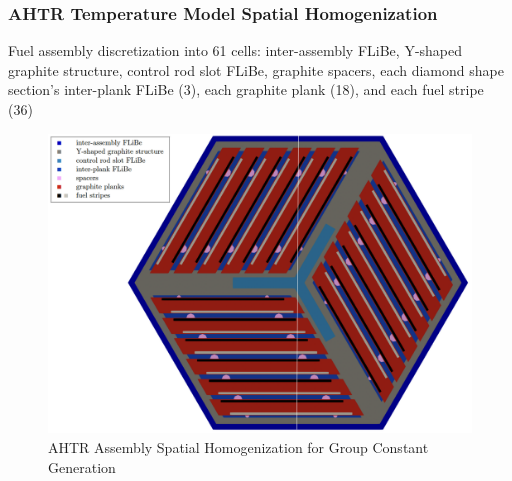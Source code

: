 \begin{frame}
    \frametitle{AHTR Temperature Model Spatial Homogenization}
        Fuel assembly discretization into 61 cells: inter-assembly FLiBe, Y-shaped graphite 
        structure, control rod slot FLiBe, graphite spacers, each diamond shape 
        section's inter-plank FLiBe (3), each graphite plank (18), and each
        fuel stripe (36)
    \begin{figure}[]
        \begin{minipage}[c]{0.75\textwidth}
            \centering
            \includegraphics[width=0.85\linewidth]{figures/assembly_mg_pres.png}
        \end{minipage}\hfill
        \begin{minipage}[c]{0.25\textwidth}
        \caption{AHTR Assembly Spatial Homogenization for Group Constant Generation}
    \end{minipage}
    \end{figure}
\end{frame}

